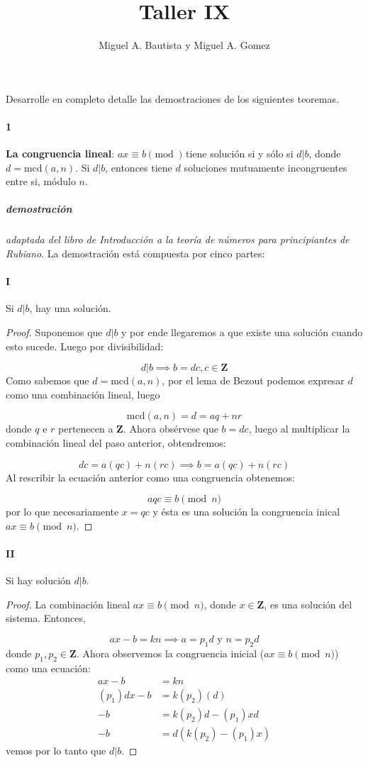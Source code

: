 \documentclass{article}
\title{Taller IX}
\author{Miguel A. Bautista y Miguel A. Gomez}
\begin{document}
	\maketitle
	
Desarrolle en completo detalle las demostraciones de los siguientes teoremas.

\paragraph{1} \textbf{La congruencia lineal}: $ax \equiv b\pmod{}$ tiene solución si y sólo si $d|b$, donde $d = \text{mcd}(a,n)$. Si $d|b$, entonces tiene $d$ soluciones mutuamente incongruentes entre si, módulo $n$.

\subparagraph{demostración} \textit{adaptada del libro de Introducción a la teoría de números para principiantes de Rubiano}. La demostración está compuesta por cinco partes:

\paragraph{I} Si $d|b$, hay una solución.

\begin{proof}
Suponemos que $d|b$ y por ende llegaremos a que existe una solución cuando esto sucede. Luego por divisibilidad:

$$d|b \implies b = dc, c \in \mathbf{Z}$$
Como sabemos que $d =\text{mcd}(a,n)$, por el lema de Bezout podemos expresar $d$ como una combinación lineal, luego

$$\text{mcd}(a,n) = d = aq + nr$$
donde $q$ e $r$ pertenecen a $\mathbf{Z}$. Ahora obsérvese que $b = dc$, luego al multiplicar la combinación lineal del paso anterior, obtendremos:

$$dc = a(qc) + n(rc) \implies b = a(qc) + n(rc)$$
Al rescribir la ecuación anterior como una congruencia obtenemos:

$$aqc \equiv b \pmod{n}$$
por lo que necesariamente $x = qc$ y ésta es una solución la congruencia inical $ax \equiv b \pmod{n}$.
\end{proof}

\paragraph{II} Si hay solución $d|b$.

\begin{proof}
La combinación lineal $ax \equiv b \pmod{n}$, donde $x \in \mathbf{Z}$, es una solución del sistema. Entonces,
    
    $$ax -b = kn \implies a = p_1 d \text{ y } n = p_2 d$$
donde $p_1, p_2 \in \mathbf{Z}$. Ahora observemos la congruencia inicial ($ax \equiv b \pmod{n}$) como una ecuación:
\begin{align*}
    ax - b &= kn\\
    (p_1)dx - b &= k(p_2)(d)\\
    -b &= k(p_2)d - (p_1)xd\\
    -b &= d(k(p_2) - (p_1)x)
\end{align*}
vemos por lo tanto que $d|b$.
\end{proof}
\end{document}

